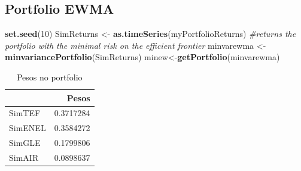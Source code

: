 \documentclass[
  12pt,
  a4paper,
  openany]{book}
\newenvironment{Shaded}{\begin{snugshade}}{\end{snugshade}}
\newcommand{\CommentTok}[1]{\textcolor[rgb]{0.56,0.35,0.01}{\textit{#1}}}
\newcommand{\DataTypeTok}[1]{\textcolor[rgb]{0.13,0.29,0.53}{#1}}
\newcommand{\DecValTok}[1]{\textcolor[rgb]{0.00,0.00,0.81}{#1}}
\newcommand{\FloatTok}[1]{\textcolor[rgb]{0.00,0.00,0.81}{#1}}
\newcommand{\KeywordTok}[1]{\textcolor[rgb]{0.13,0.29,0.53}{\textbf{#1}}}
\newcommand{\NormalTok}[1]{#1}
\newcommand{\OperatorTok}[1]{\textcolor[rgb]{0.81,0.36,0.00}{\textbf{#1}}}
\newcommand{\StringTok}[1]{\textcolor[rgb]{0.31,0.60,0.02}{#1}}
\begin{document}
\justifying
\bigskip

\hypertarget{portfolio-ewma}{%
\subsection{Portfolio EWMA}\label{portfolio-ewma}}

\scriptsize

\begin{Shaded}
\begin{Highlighting}[]
\KeywordTok{set.seed}\NormalTok{(}\DecValTok{10}\NormalTok{)}
\NormalTok{SimReturns \textless{}{-}}\StringTok{ }\KeywordTok{as.timeSeries}\NormalTok{(myPortfolioReturns)}
\CommentTok{\#returns the portfolio with the minimal risk on the efficient frontier}
\NormalTok{minvarewma \textless{}{-}}\StringTok{ }\KeywordTok{minvariancePortfolio}\NormalTok{(SimReturns) }
\NormalTok{minew\textless{}{-}}\KeywordTok{getPortfolio}\NormalTok{(minvarewma)}
\end{Highlighting}
\end{Shaded}

\normalsize

\begin{table}[!h]

\caption{\label{tab:unnamed-chunk-26}Pesos no portfolio}
\centering
\begin{tabular}[t]{lr}
\toprule
  & Pesos\\
\midrule
SimTEF & 0.3717284\\
SimENEL & 0.3584272\\
SimGLE & 0.1799806\\
SimAIR & 0.0898637\\
\bottomrule
\end{tabular}
\end{table}

\scriptsize

\begin{Shaded}
\end{Shaded}
\end{document}
